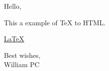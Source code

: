 \documentclass{letter}
\begin{document}
Hello,

This a example of TeX to HTML. 

\href{http://LaTeX.org}{LaTeX}

Best wishes,
\newline \\

William PC
\end{document}
